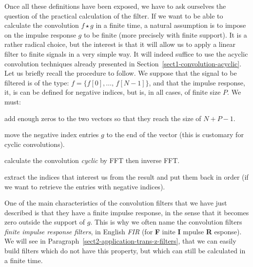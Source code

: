  
 Once all these definitions have been exposed, we have to ask ourselves the question of the practical calculation of the filter. If we want to be able to calculate the convolution $ f \star g $ in a finite time, a natural assumption is to impose on the impulse response $ g $ to be finite (more precisely with finite support). It is a rather radical choice, but the interest is that it will allow us to apply a linear filter to finite signals in a very simple way. It will indeed suffice to use the acyclic convolution techniques already presented in Section~\ref{sect1-convolution-acyclic}. Let us briefly recall the procedure to follow. We suppose that the signal to be filtered is of the type: $ f = \{f [0], \ldots, \, f [N-1] \} $, and that the impulse response, it, is can be defined for negative indices, but is, in all cases, of finite size $ P $. We must: \begin{rs}
\item add enough zeros to the two vectors so that they reach the size of $ N + P-1 $.
\item move the negative index entries $ g $ to the end of the vector (this is customary for cyclic convolutions).
\item calculate the convolution \textit{cyclic} by FFT then inverse FFT.
\item extract the indices that interest us from the result and put them back in order (if we want to retrieve the entries with negative indices).
\end{rs}
 
 
One of the main characteristics of the convolution filters that we have just described is that they have a finite impulse response, in the sense that it becomes zero outside the support of $ g $. This is why we often name the convolution filters \textit{finite impulse response filters}, in English \textit{FIR} (for \textbf{F} inite \textbf{I} mpulse \textbf{R} esponse). We will see in Paragraph~\ref{sect2-application-trans-z-filters}, that we can easily build filters which do not have this property, but which can still be calculated in a finite time.
 
